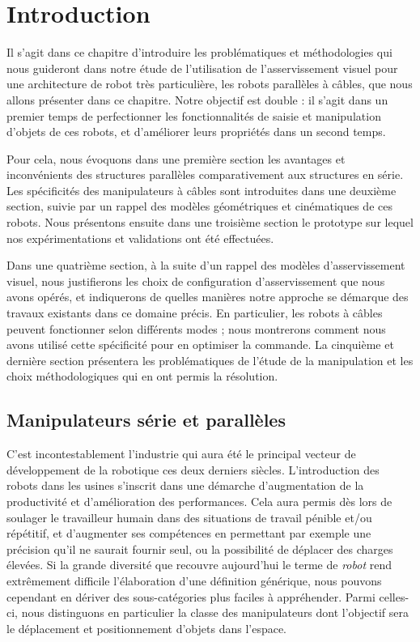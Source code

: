 \chapter{Introduction} \label{chap0}

Il s'agit dans ce chapitre d'introduire les problématiques et méthodologies qui 
nous guideront dans notre étude de l'utilisation de l'asservissement visuel pour 
une architecture de robot très particulière, les robots parall\`eles \`a 
c\^ables, que nous allons présenter dans ce chapitre. Notre objectif est double 
: il s'agit dans un premier temps de perfectionner les fonctionnalités de 
saisie et manipulation d'objets de ces robots, et d'améliorer leurs propriétés 
dans un second temps.

Pour cela, nous  évoquons dans une première section les avantages et 
inconvénients des structures parallèles comparativement aux structures en série. 
Les spécificités des manipulateurs à c\^ables sont introduites dans une deuxième 
section, suivie par un rappel des modèles géométriques et cinématiques de ces 
robots. Nous présentons ensuite dans une 
troisième section le prototype sur lequel nos expérimentations et validations 
ont été effectuées.

Dans une quatrième section, à la suite d'un rappel des modèles 
d'asser\-vissement visuel, nous justifierons les choix de configuration 
d'asservissement que nous avons opérés, et indiquerons de quelles manières 
notre approche se démarque des travaux existants dans ce domaine précis. En 
particulier, les robots à câbles peuvent fonctionner selon différents modes ; 
nous montrerons comment nous avons utilisé cette spécificité pour en optimiser 
la commande. La cinquième et dernière section présentera les problématiques de 
l'étude de la manipulation et les choix méthodologiques qui en ont permis la 
résolution.

\section{Manipulateurs série et parallèles} \label{chap0-0}

C'est incontestablement l'industrie qui aura été le principal vecteur de développe\-ment de la robotique ces deux derniers siècles. L'introduction des robots dans les usines s'inscrit dans une démarche d'augmentation de la productivité et d'amélio\-ration des performances. Cela aura permis dès lors de soulager le travailleur humain dans des situations de travail pénible et/ou répétitif, et d'augmenter ses compétences en permettant par exemple une précision qu'il ne saurait fournir seul, ou la possibilité de déplacer des charges élevées. Si la grande diversité que recouvre aujourd'hui le terme de {\it robot} rend extrêmement difficile l'élaboration d'une définition générique, nous pouvons cependant en dériver des sous-catégories plus faciles à appréhender. Parmi celles-ci, nous distinguons en particulier la classe des manipulateurs dont l'objectif sera le déplacement et positionnement d'objets dans l'espace.

